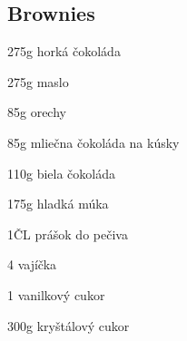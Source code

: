 \setcounter{step}{0}
\subsection{Brownies}

\begin{ingredient}
\begin{main}
	\item 275g horká čokoláda
	\item 275g maslo
	\item 85g orechy
	\item 85g mliečna čokoláda na kúsky
	\item 110g biela čokoláda
	\item 175g hladká múka
	\item 1ČL prášok do pečiva
	\item 4 vajíčka
	\item 1 vanilkový cukor
	\item 300g kryštálový cukor
\end{main}
\end{ingredient}%
\begin{recipe}


\end{recipe}

\begin{notes}

\end{notes}	